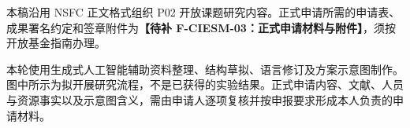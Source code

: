 \justifying
\NSFCBodyText

本稿沿用 NSFC 正文格式组织 P02 开放课题研究内容。正式申请所需的申请表、成果署名约定和签章附件为\textbf{【待补 F-CIESM-03：正式申请材料与附件】}，须按开放基金指南办理。

本轮使用生成式人工智能辅助资料整理、结构草拟、语言修订及方案示意图制作。图中所示为拟开展研究流程，不是已获得的实验结果。正式申请内容、文献、人员与资源事实以及示意图含义，需由申请人逐项复核并按申报要求形成本人负责的申请材料。
